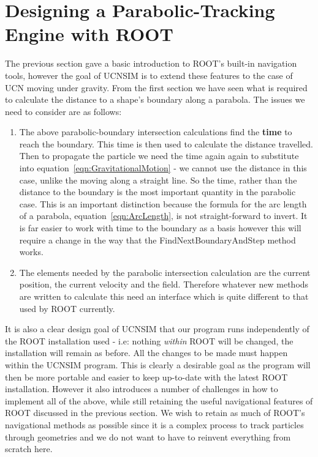 \documentclass[11pt,a4paper,oneside]{article}
\begin{document}
\section{Designing a Parabolic-Tracking Engine with ROOT}

The previous section gave a basic introduction to ROOT's built-in navigation tools, however the goal of UCNSIM is to extend these features to the case of UCN moving under gravity. From the first section we have seen what is required to calculate the distance to a shape's boundary along a parabola. The issues we need to consider are as follows:

\begin{enumerate}
	\item The above parabolic-boundary intersection calculations find the \textbf{time} to reach the boundary. This time is then used to calculate the distance travelled. Then to propagate the particle we need the time again again to substitute into equation~\ref{eqn:GravitationalMotion} - we cannot use the distance in this case, unlike the moving along a straight line. So the time, rather than the distance to the boundary is the most important quantity in the parabolic case. This is an important distinction because the formula for the arc length of a parabola, equation~\ref{eqn:ArcLength}, is not straight-forward to invert. It is far easier to work with time to the boundary as a basis however this will require a change in the way that the FindNextBoundaryAndStep method works.
	\item The elements needed by the parabolic intersection calculation are the current position, the current velocity and the field. Therefore whatever new methods are written to calculate this need an interface which is quite different to that used by ROOT currently. 
\end{enumerate}

It is also a clear design goal of UCNSIM that our program runs independently of the ROOT installation used - i.e: nothing \textit{within} ROOT will be changed, the installation will remain as before. All the changes to be made must happen within the UCNSIM program. This is clearly a desirable goal as the program will then be more portable and easier to keep up-to-date with the latest ROOT installation. However it also introduces a number of challenges in how to implement all of the above, while still retaining the useful navigational features of ROOT discussed in the previous section. We wish to retain as much of ROOT's navigational methods as possible since it is a complex process to track particles through geometries and we do not want to have to reinvent everything from scratch here. 
\end{document}
